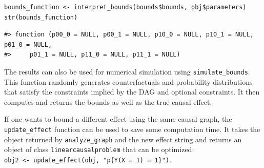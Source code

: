 \begin{verbatim}
bounds_function <- interpret_bounds(bounds$bounds, obj$parameters)
str(bounds_function)
\end{verbatim}

\begin{verbatim}
#> function (p00_0 = NULL, p00_1 = NULL, p10_0 = NULL, p10_1 = NULL, p01_0 = NULL, 
#>     p01_1 = NULL, p11_0 = NULL, p11_1 = NULL)
\end{verbatim}

The results can also be used for numerical simulation using \texttt{simulate\_bounds}. This function randomly generates counterfactuals and probability distributions that satisfy the constraints implied by the DAG and optional constraints. It then computes and returns the bounds as well as the true causal effect.

If one wants to bound a different effect using the same causal graph, the \texttt{update\_effect} function can be used to save some computation time. It takes the object returned by \texttt{analyze\_graph} and the new effect string and returns an object of class \texttt{linearcausalproblem} that can be optimized:\\
\texttt{obj2\ \textless{}-\ update\_effect(obj,\ "p\{Y(X\ =\ 1)\ =\ 1\}")}.

